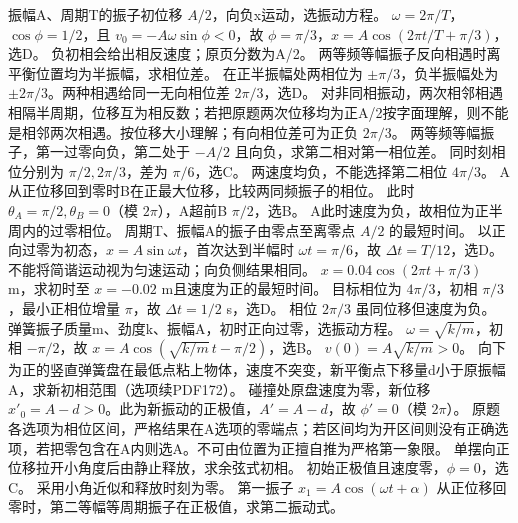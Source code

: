 \problemtext 振幅A、周期T的振子初位移 $A/2$，向负x运动，选振动方程。
\workings $\omega=2\pi/T$，$\cos\phi=1/2$，且 $v_0=-A\omega\sin\phi<0$，故 $\phi=\pi/3$，$x=A\cos(2\pi t/T+\pi/3)$，选D。
\crosscheck 负初相会给出相反速度；原页分数为A/2。
\problemtext 两等频等幅振子反向相遇时离平衡位置均为半振幅，求相位差。
\workings 在正半振幅处两相位为 $\pm\pi/3$，负半振幅处为 $\pm2\pi/3$。两种相遇给同一无向相位差 $2\pi/3$，选D。
\crosscheck 对非同相振动，两次相邻相遇相隔半周期，位移互为相反数；若把原题两次位移均为正A/2按字面理解，则不能是相邻两次相遇。按位移大小理解；有向相位差可为正负 $2\pi/3$。
\problemtext 两等频等幅振子，第一过零向负，第二处于 $-A/2$ 且向负，求第二相对第一相位差。
\workings 同时刻相位分别为 $\pi/2,2\pi/3$，差为 $\pi/6$，选C。
\crosscheck 两速度均负，不能选择第二相位 $4\pi/3$。
\problemtext A从正位移回到零时B在正最大位移，比较两同频振子的相位。
\workings 此时 $\theta_A=\pi/2,\theta_B=0$（模 $2\pi$），A超前B $\pi/2$，选B。
\crosscheck A此时速度为负，故相位为正半周内的过零相位。
\problemtext 周期T、振幅A的振子由零点至离零点 $A/2$ 的最短时间。
\workings 以正向过零为初态，$x=A\sin\omega t$，首次达到半幅时 $\omega t=\pi/6$，故 $\Delta t=T/12$，选D。
\crosscheck 不能将简谐运动视为匀速运动；向负侧结果相同。
\problemtext $x=0.04\cos(2\pi t+\pi/3)$ m，求初时至 $x=-0.02$ m且速度为正的最短时间。
\workings 目标相位为 $4\pi/3$，初相 $\pi/3$，最小正相位增量 $\pi$，故 $\Delta t=1/2$ s，选D。
\crosscheck 相位 $2\pi/3$ 虽同位移但速度为负。
\problemtext 弹簧振子质量m、劲度k、振幅A，初时正向过零，选振动方程。
\workings $\omega=\sqrt{k/m}$，初相 $-\pi/2$，故 $x=A\cos(\sqrt{k/m}\,t-\pi/2)$，选B。
\crosscheck $v(0)=A\sqrt{k/m}>0$。
\problemtext 向下为正的竖直弹簧盘在最低点粘上物体，速度不突变，新平衡点下移量d小于原振幅A，求新初相范围（选项续PDF172）。
\workings 碰撞处原盘速度为零，新位移 $x'_0=A-d>0$。此为新振动的正极值，$A'=A-d$，故 $\phi'=0$（模 $2\pi$）。
\crosscheck 原题各选项为相位区间，严格结果在A选项的零端点；若区间均为开区间则没有正确选项，若把零包含在A内则选A。不可由位置为正擅自推为严格第一象限。
\problemtext 单摆向正位移拉开小角度后由静止释放，求余弦式初相。
\workings 初始正极值且速度零，$\phi=0$，选C。
\crosscheck 采用小角近似和释放时刻为零。
\problemtext 第一振子 $x_1=A\cos(\omega t+\alpha)$ 从正位移回零时，第二等幅等周期振子在正极值，求第二振动式。
